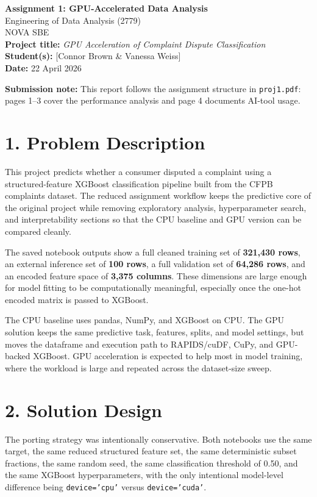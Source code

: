 \documentclass[10pt]{article}
\begin{document}
\begin{center}
  {\Large \textbf{Assignment 1: GPU-Accelerated Data Analysis}}\\[0.25em]
  Engineering of Data Analysis (2779)\\
  NOVA SBE\\[0.45em]
  \textbf{Project title:} \emph{GPU Acceleration of Complaint Dispute Classification}\\
  \textbf{Student(s):} [Connor Brown \& Vanessa Weiss]\\
  \textbf{Date:} 22 April 2026
\end{center}

{\small
\textbf{Submission note:} This report follows the assignment structure in \texttt{proj1.pdf}: pages 1--3 cover the performance analysis and page 4 documents AI-tool usage.
}

\section*{1. Problem Description}
This project predicts whether a consumer disputed a complaint using a structured-feature XGBoost classification pipeline built from the CFPB complaints dataset. The reduced assignment workflow keeps the predictive core of the original project while removing exploratory analysis, hyperparameter search, and interpretability sections so that the CPU baseline and GPU version can be compared cleanly.

The saved notebook outputs show a full cleaned training set of \textbf{321,430 rows}, an external inference set of \textbf{100 rows}, a full validation set of \textbf{64,286 rows}, and an encoded feature space of \textbf{3,375 columns}. These dimensions are large enough for model fitting to be computationally meaningful, especially once the one-hot encoded matrix is passed to XGBoost.

The CPU baseline uses pandas, NumPy, and XGBoost on CPU. The GPU solution keeps the same predictive task, features, splits, and model settings, but moves the dataframe and execution path to RAPIDS/cuDF, CuPy, and GPU-backed XGBoost. GPU acceleration is expected to help most in model training, where the workload is large and repeated across the dataset-size sweep.

\section*{2. Solution Design}
The porting strategy was intentionally conservative. Both notebooks use the same target, the same reduced structured feature set, the same deterministic subset fractions, the same random seed, the same classification threshold of 0.50, and the same XGBoost hyperparameters, with the only intentional model-level difference being \texttt{device='cpu'} versus \texttt{device='cuda'}.
\end{document}
